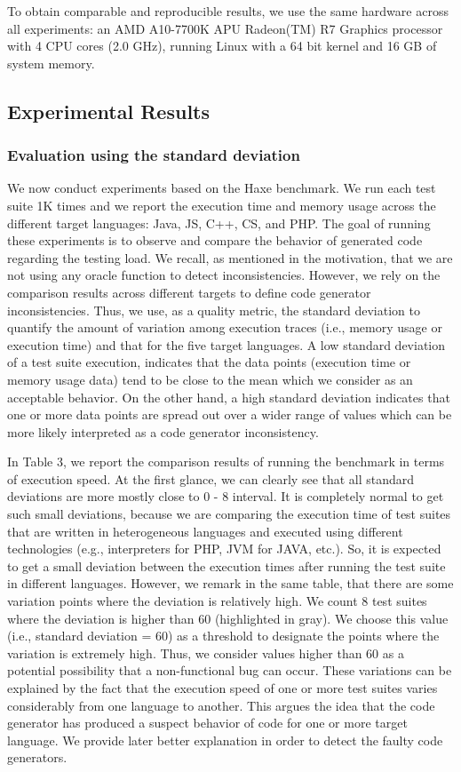 To obtain comparable and reproducible results, we use the same hardware across all experiments: an AMD A10-7700K APU Radeon(TM) R7 Graphics processor with 4 CPU cores (2.0 GHz), running Linux with a 64 bit kernel and 16 GB of system memory.

\subsection{Experimental Results}
\subsubsection{Evaluation using the standard deviation}
We now conduct experiments based on the Haxe benchmark. We run each test suite 1K times and we report the execution time and memory usage across the different target languages: Java, JS, C++, CS, and PHP. 
The goal of running these experiments is to observe and compare the behavior of generated code regarding the testing load. We recall, as mentioned in the motivation, that we are not using any oracle function to detect inconsistencies. However, we rely on the comparison results across different targets to define code generator inconsistencies.
Thus, we use, as a quality metric, the standard deviation to quantify the amount of variation among execution traces (i.e., memory usage or execution time) and that for the five target languages. A low standard deviation of a test suite execution, indicates that the data points (execution time or memory usage data) tend to be close to the mean which we consider as an acceptable behavior.  
On the other hand, a high standard deviation indicates that one or more data points are spread out over a wider range of values which can be more likely interpreted as a code generator inconsistency. 


In Table 3, we report the comparison results of running the benchmark in terms of execution speed. At the first glance, we can clearly see that all standard deviations are more mostly close to 0 - 8 interval. It is completely normal to get such small deviations, because we are comparing the execution time of test suites that are written in heterogeneous languages and executed using different technologies (e.g., interpreters for PHP, JVM for JAVA, etc.). So, it is expected to get a small deviation between the execution times after running the test suite in different languages. However, we remark in the same table, that there are some variation points where the deviation is relatively high. We count 8 test suites where the deviation is higher than 60 (highlighted in gray). We choose this value (i.e., standard deviation = 60) as a threshold to designate the points where the variation is extremely high. Thus, we consider values higher than 60 as a potential possibility that a non-functional bug can occur. These variations can be explained by the fact that the execution speed of one or more test suites varies considerably from one language to another. This argues the idea that the code generator has produced a suspect behavior of code for one or more target language. We provide later better explanation in order to detect the faulty code generators.

